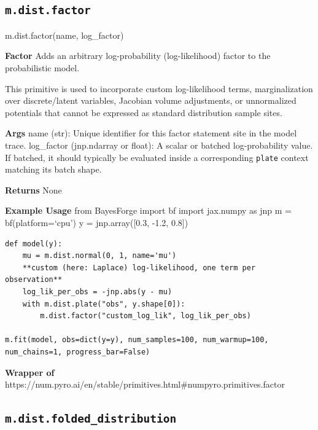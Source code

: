 \documentclass[
  letterpaper,
  DIV=11,
  numbers=noendperiod]{scrartcl}
\newenvironment{Shaded}{\begin{snugshade}}{\end{snugshade}}
\newcommand{\NormalTok}[1]{\textcolor[rgb]{0.00,0.23,0.31}{#1}}
\begin{document}
\subsection{\texorpdfstring{\texttt{m.dist.factor}}{m.dist.factor}}\label{factor}

\begin{Shaded}
\begin{Highlighting}[]
\NormalTok{m.dist.factor(name, log\_factor)}
\end{Highlighting}
\end{Shaded}

\textbf{Factor} Adds an arbitrary log-probability (log-likelihood)
factor to the probabilistic model.

This primitive is used to incorporate custom log-likelihood terms,
marginalization over discrete/latent variables, Jacobian volume
adjustments, or unnormalized potentials that cannot be expressed as
standard distribution sample sites.

\textbf{Args} name (str): Unique identifier for this factor statement
site in the model trace. log\_factor (jnp.ndarray or float): A scalar or
batched log-probability value. If batched, it should typically be
evaluated inside a corresponding \texttt{plate} context matching its
batch shape.

\textbf{Returns} None

\textbf{Example Usage} from BayesForge import bf import jax.numpy as jnp
m = bf(platform=`cpu') y = jnp.array({[}0.3, -1.2, 0.8{]})

\begin{verbatim}
def model(y):
    mu = m.dist.normal(0, 1, name='mu')
    **custom (here: Laplace) log-likelihood, one term per observation**
    log_lik_per_obs = -jnp.abs(y - mu)
    with m.dist.plate("obs", y.shape[0]):
        m.dist.factor("custom_log_lik", log_lik_per_obs)

m.fit(model, obs=dict(y=y), num_samples=100, num_warmup=100, num_chains=1, progress_bar=False)
\end{verbatim}

\textbf{Wrapper of}
https://num.pyro.ai/en/stable/primitives.html\#numpyro.primitives.factor

\subsection{\texorpdfstring{\texttt{m.dist.folded\_distribution}}{m.dist.folded\_distribution}}\label{folded_distribution}
\end{document}
